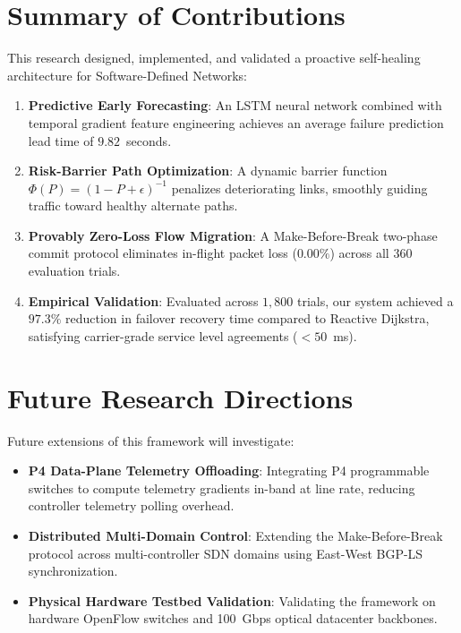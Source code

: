 \documentclass[11pt,a4paper]{report}
\begin{document}
\section{Summary of Contributions}
This research designed, implemented, and validated a proactive self-healing architecture for Software-Defined Networks:
\begin{enumerate}
    \item \textbf{Predictive Early Forecasting}: An LSTM neural network combined with temporal gradient feature engineering achieves an average failure prediction lead time of $9.82$~seconds.
    \item \textbf{Risk-Barrier Path Optimization}: A dynamic barrier function $\Phi(P) = (1 - P + \epsilon)^{-1}$ penalizes deteriorating links, smoothly guiding traffic toward healthy alternate paths.
    \item \textbf{Provably Zero-Loss Flow Migration}: A Make-Before-Break two-phase commit protocol eliminates in-flight packet loss ($0.00\%$) across all $360$ evaluation trials.
    \item \textbf{Empirical Validation}: Evaluated across $1{,}800$ trials, our system achieved a $97.3\%$ reduction in failover recovery time compared to Reactive Dijkstra, satisfying carrier-grade service level agreements ($< 50$~ms).
\end{enumerate}

\section{Future Research Directions}
Future extensions of this framework will investigate:
\begin{itemize}
    \item \textbf{P4 Data-Plane Telemetry Offloading}: Integrating P4 programmable switches to compute telemetry gradients in-band at line rate, reducing controller telemetry polling overhead.
    \item \textbf{Distributed Multi-Domain Control}: Extending the Make-Before-Break protocol across multi-controller SDN domains using East-West BGP-LS synchronization.
    \item \textbf{Physical Hardware Testbed Validation}: Validating the framework on hardware OpenFlow switches and 100~Gbps optical datacenter backbones.
\end{itemize}

\newpage


\end{document}
